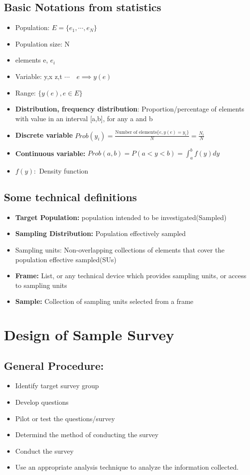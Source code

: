 \documentclass{article}
\theoremstyle{definition}
\theoremstyle{thrm}
\theoremstyle{lma}
\theoremstyle{ppst}
\theoremstyle{crlr}
\begin{document}
\subsection{Basic Notations from statistics}
\begin{itemize}
	\item Population: $E = \{e_1,\cdots, e_N\}$
	\item Population size: N
	\item elements e, $e_i$
	\item Variable: y,x z,t $\cdots \quad e\implies y(e)$
	\item Range: $\{y(e), e\in E\}$
	\item \textbf{Distribution, frequency distribution}: Proportion/percentage of elements with value in an interval [a,b], for any a and b
	\item \textbf{Discrete variable} $Prob(y_i) = \frac{\text{Number of elements}\{e,y(e) = y_i\}}{N} = \frac{N_i}{N}$
	\item \textbf{Continuous variable:} $Prob(a,b) = P(a<y<b) = \int_a^bf(y)dy$
	\item $f(y):$ Density function
\end{itemize}

\subsection{Some technical definitions}
\begin{itemize}
	\item \textbf{Target Population: } population intended to be investigated(Sampled)
	\item \textbf{Sampling Distribution: } Population effectively sampled 
	\item Sampling units: Non-overlapping collections of elements that cover the population effective sampled(SUs)
	\item \textbf{Frame: }List, or any technical device which provides sampling units, or access to sampling units
	\item \textbf{Sample: } Collection of sampling units selected from a frame
\end{itemize}


\section{Design of Sample Survey}
\subsection{General Procedure: }
\begin{itemize}
	\item Identify target survey group
	\item Develop questions
	\item Pilot or test the questions/survey
	\item Determind the method of conducting the survey
	\item Conduct the survey
	\item Use an appropriate analysis technique to analyze the information collected.
\end{itemize}
\end{document}
